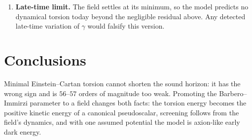 \documentclass[11pt]{article}
\newcommand{\Mp}{M_{\rm Pl}}
\begin{document}
\begin{enumerate}
background $b_0\simeq\frac34\,\dot{\bar\gamma}$. At the best fit ($F=0.137\,\Mp$,
$\theta_i=2.79$, $z_c\simeq3570$, $n=3$) the oscillation amplitude decays as $a^{-3/(n+1)}$,
giving $\theta\simeq6\times10^{-3}$ and a frequency $\lesssim10^{-33}$~eV today, hence
$b_0\sim6\times10^{-46}$~GeV. Bounds from Lorentz-violation tests are about
$10^{-31}$--$2\times10^{-27}$~GeV \cite{kostelecky2008}. The model is safe, and not testable
in the laboratory today.
\item \textbf{Late-time limit.} The field settles at its minimum, so the model predicts no
dynamical torsion today beyond the negligible residual above. Any detected late-time
variation of $\gamma$ would falsify this version.
\end{enumerate}

\section{Conclusions}
Minimal Einstein--Cartan torsion cannot shorten the sound horizon: it has the wrong sign
and is $56$--$57$ orders of magnitude too weak. Promoting the Barbero--Immirzi parameter to a
field changes both facts: the torsion energy becomes the positive kinetic energy of a
canonical pseudoscalar, screening follows from the field's dynamics, and with one assumed
potential the model is axion-like early dark energy.
\end{document}
